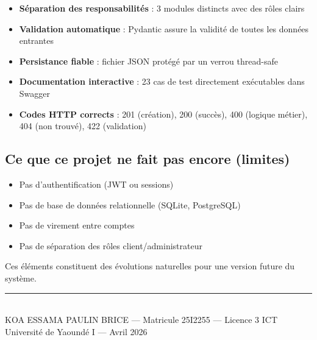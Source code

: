 \documentclass[12pt,a4paper]{article}
\begin{document}
\begin{itemize}[noitemsep]
  \item \textbf{Séparation des responsabilités} : 3 modules distincts avec des rôles clairs
  \item \textbf{Validation automatique} : Pydantic assure la validité de toutes les données entrantes
  \item \textbf{Persistance fiable} : fichier JSON protégé par un verrou thread-safe
  \item \textbf{Documentation interactive} : 23 cas de test directement exécutables dans Swagger
  \item \textbf{Codes HTTP corrects} : 201 (création), 200 (succès), 400 (logique métier), 404 (non trouvé), 422 (validation)
\end{itemize}

\subsection*{Ce que ce projet ne fait pas encore (limites)}

\begin{itemize}[noitemsep]
  \item Pas d'authentification (JWT ou sessions)
  \item Pas de base de données relationnelle (SQLite, PostgreSQL)
  \item Pas de virement entre comptes
  \item Pas de séparation des rôles client/administrateur
\end{itemize}

Ces éléments constituent des évolutions naturelles pour une version future du système.

\vfill
\begin{center}
\rule{0.5\linewidth}{0.5pt}\\[0.3cm]
{\small KOA ESSAMA PAULIN BRICE — Matricule 25I2255 — Licence 3 ICT\\
Université de Yaoundé I — Avril 2026}
\end{center}
\end{document}
